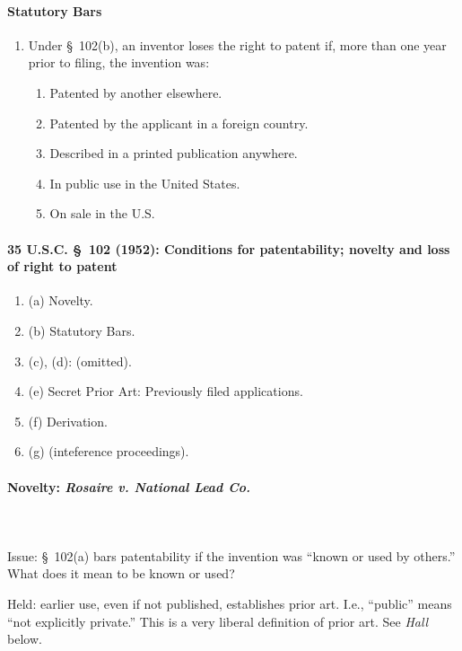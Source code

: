 \paragraph{Statutory Bars}

\begin{enumerate}
    \item Under \S\ 102(b), an inventor loses the right to patent if, more 
    than one year prior to filing, the invention was:
    \begin{enumerate}
        \item Patented by another elsewhere.
        \item Patented by the applicant in a foreign country.
        \item Described in a printed publication anywhere.
        \item In public use in the United States.
        \item On sale in the U.S.
    \end{enumerate}
\end{enumerate}

\paragraph{35 U.S.C. \S\ 102 (1952): Conditions for patentability; novelty and 
loss of right to patent}

\begin{enumerate}
    \item (a) Novelty.
    \item (b) Statutory Bars.
    \item (c), (d): (omitted).
    \item (e) Secret Prior Art: Previously filed applications.
    \item (f) Derivation.
    \item (g) (inteference proceedings).
\end{enumerate}

\paragraph{Novelty: \emph{Rosaire v. National Lead Co.}}
~\\\\
Issue: \S\ 102(a) bars patentability if the invention was ``known or used by 
others.'' What does it mean to be known or used?

Held: earlier use, even if not published, establishes prior art. I.e., 
``public'' means ``not explicitly private.'' This is a very liberal definition 
of prior art. See \emph{Hall} below.

